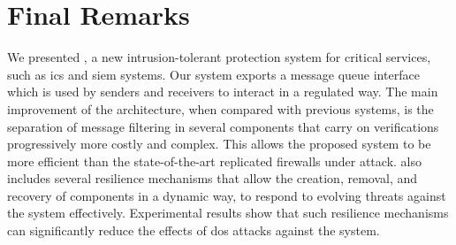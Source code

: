 \section{Final Remarks}
\label{sec:finalremarkssieveq}

We presented \sieveq, a new intrusion-tolerant protection system for critical services, such as \gls{ics} and \gls{siem} systems.
Our system exports a message queue interface which is used by senders and receivers to interact in a regulated way.
The main improvement of the \sieveq architecture, when compared with previous systems, is the separation of message filtering in several components that carry on verifications progressively more costly and complex.
This allows the proposed system to be more efficient than the state-of-the-art replicated firewalls under attack.
\sieveq also includes several resilience mechanisms that allow the creation, removal, and recovery of components in a dynamic way, to respond to evolving threats against the system effectively. 
Experimental results show that such resilience mechanisms can significantly reduce the effects of \gls{dos} attacks against the system.


